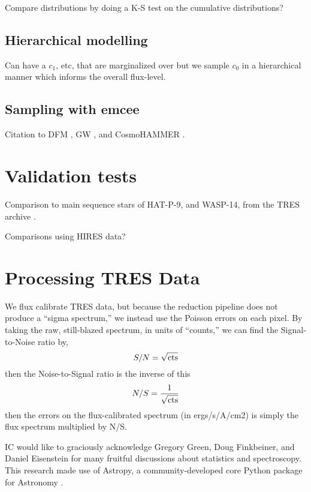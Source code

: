 \documentclass[preprint]{aastex} %
\begin{document}
Compare distributions by doing a K-S test on the cumulative distributions?

\subsection{Hierarchical modelling}
Can have a $c_1$, etc, that are marginalized over but we sample $c_0$ in a hierarchical manner which informs the overall flux-level.

\subsection{Sampling with emcee}
Citation to DFM \citep{fhl+12}, GW \citep{gw10}, and CosmoHAMMER \citep{asa+13}.

\section{Validation tests}
Comparison to main sequence stars of HAT-P-9, and WASP-14, from the TRES archive \citep{tfs+12}.

Comparisons using HIRES data?

\section{Processing TRES Data}
We flux calibrate TRES data, but because the reduction pipeline does not produce a ``sigma spectrum,'' we instead use the Poisson errors on each pixel. By taking the raw, still-blazed spectrum, in units of ``counts,'' we can find the Signal-to-Noise ratio by,
\begin{equation}
  S/N = \sqrt{ {\rm cts}}
\end{equation}
then the Noise-to-Signal ratio is the inverse of this
\begin{equation}
  N/S = \frac{1}{\sqrt{ {\rm cts}}}
\end{equation}
then the errors on the flux-calibrated spectrum (in ergs/s/A/cm2) is simply the flux spectrum multiplied by N/S. 

\acknowledgments
IC would like to graciously acknowledge Gregory Green, Doug Finkbeiner, and Daniel Eisenstein for many fruitful discussions about statistics and spectroscopy. This research made use of Astropy, a community-developed core Python package for Astronomy \citep{art+13}.

%
%



\end{document}
